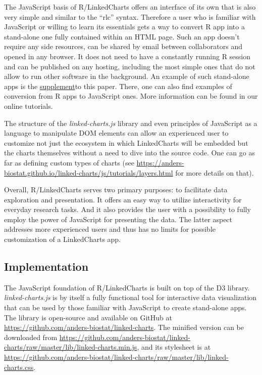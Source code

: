 \documentclass[twocolumn,10pt]{article}
\newcommand{\supplement}{\href{https://anders-biostat.github.io/lc-paper/}{supplement}}
\begin{document}
The JavaScript basis of R/LinkedCharts offers an interface of its own that is also very simple and similar to the ``rlc'' syntax. Therefore a user who is familiar with JavaScript or willing to learn its essentials gets a way to convert R app into a stand-alone one fully contained within an HTML page. Such an app doesn't require any side resources, can be shared by email between collaborators and opened in any browser. It does not need to have a constantly running R session and can be published on any hosting, including the most simple ones that do not allow to run other software in the background. An example of such stand-alone apps is the \supplement to this paper. There, one can also find examples of conversion from R apps to JavaScript ones. More information can be found in our online tutorials.

The structure of the \emph{linked-charts.js} library and even principles of JavaScript as a language to manipulate DOM elements can allow an experienced user to customize not just the ecosystem in which LinkedCharts will be embedded but the charts themselves without a need to dive into the source code. One can go as far as defining custom types of charts (see \url{https://anders-biostat.github.io/linked-charts/js/tutorials/layers.html} for more details on that).

Overall, R/LinkedCharts serves two primary purposes: to facilitate data exploration and presentation. It offers an easy way to utilize interactivity for everyday research tasks. And it also provides the user with a possibility to fully employ the power of JavaScript for presenting the data. The latter aspect addresses more experienced users and thus has no limits for possible customization of a LinkedCharts app.


\subsection{Implementation}

The JavaScript foundation of R/LinkedCharts is built on top of the D3 \citep{bostock_2011} library. \emph{linked-charts.js} is by itself a fully functional tool for interactive data visualization that can be used by those familiar with JavaScript to create stand-alone apps. The library is open-source and available on GitHub at \url{https://github.com/anders-biostat/linked-charts}. The minified version can be downloaded from \url{https://github.com/anders-biostat/linked-charts/raw/master/lib/linked-charts.min.js}, and its stylesheet is at \url{https://github.com/anders-biostat/linked-charts/raw/master/lib/linked-charts.css}.
\end{document}
